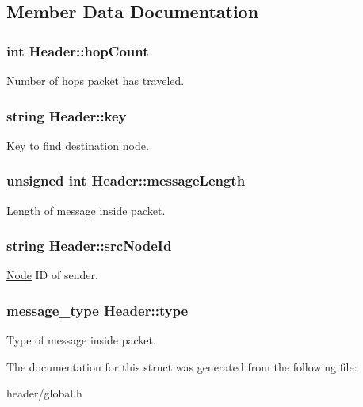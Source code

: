 \subsection{Member Data Documentation}
\hypertarget{structHeader_ace726663a32d9fecdcdd75b5e3694fd0}{
\subsubsection[{hop\-Count}]{\setlength{\rightskip}{0pt plus 5cm}int Header\-::hop\-Count}}\label{structHeader_ace726663a32d9fecdcdd75b5e3694fd0}
Number of hops packet has traveled. \hypertarget{structHeader_ad001106fe7ad847b04142073cae7e949}{
\subsubsection[{key}]{\setlength{\rightskip}{0pt plus 5cm}string Header\-::key}}\label{structHeader_ad001106fe7ad847b04142073cae7e949}
Key to find destination node. \hypertarget{structHeader_ac869adfa2b931401d8161bd6dd3b2877}{
\subsubsection[{message\-Length}]{\setlength{\rightskip}{0pt plus 5cm}unsigned int Header\-::message\-Length}}\label{structHeader_ac869adfa2b931401d8161bd6dd3b2877}
Length of message inside packet. \hypertarget{structHeader_a679d7b3c49799d034546e100c4e13f01}{
\subsubsection[{src\-Node\-Id}]{\setlength{\rightskip}{0pt plus 5cm}string Header\-::src\-Node\-Id}}\label{structHeader_a679d7b3c49799d034546e100c4e13f01}
\hyperlink{classNode}{Node} I\-D of sender. \hypertarget{structHeader_ac65c132da14fd2ac678c55db412ce559}{
\subsubsection[{type}]{\setlength{\rightskip}{0pt plus 5cm}message\-\_\-type Header\-::type}}\label{structHeader_ac65c132da14fd2ac678c55db412ce559}
Type of message inside packet. 

The documentation for this struct was generated from the following file\-:\begin{DoxyCompactItemize}
\item 
header/global.\-h\end{DoxyCompactItemize}
